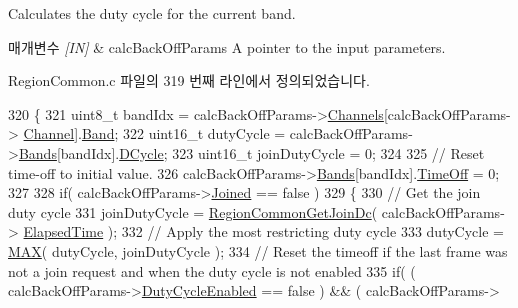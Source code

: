 Calculates the duty cycle for the current band. 


\begin{DoxyParams}{매개변수}
{\em \mbox{[}\+I\+N\mbox{]}} & calc\+Back\+Off\+Params A pointer to the input parameters. \\
\hline
\end{DoxyParams}


Region\+Common.\+c 파일의 319 번째 라인에서 정의되었습니다.


\begin{DoxyCode}
320 \{
321     uint8\_t bandIdx = calcBackOffParams->\mbox{\hyperlink{structs_region_common_calc_back_off_params_afecbd1e457cbd79eb7072bd140ff33d4}{Channels}}[calcBackOffParams->
      \mbox{\hyperlink{structs_region_common_calc_back_off_params_a1ca6f01ca18afe402de51babe8c95f5e}{Channel}}].\mbox{\hyperlink{structs_channel_params_a724c03aa06953111c3291243831f251b}{Band}};
322     uint16\_t dutyCycle = calcBackOffParams->\mbox{\hyperlink{structs_region_common_calc_back_off_params_a18afce97f43b46e9d294e5babbb15f15}{Bands}}[bandIdx].\mbox{\hyperlink{structs_band_a9ab2dfbcbe5e7e43c95ff6a436886139}{DCycle}};
323     uint16\_t joinDutyCycle = 0;
324 
325     \textcolor{comment}{// Reset time-off to initial value.}
326     calcBackOffParams->\mbox{\hyperlink{structs_region_common_calc_back_off_params_a18afce97f43b46e9d294e5babbb15f15}{Bands}}[bandIdx].\mbox{\hyperlink{structs_band_a4de67f0652eb4259907c41ea8056c318}{TimeOff}} = 0;
327 
328     \textcolor{keywordflow}{if}( calcBackOffParams->\mbox{\hyperlink{structs_region_common_calc_back_off_params_ac2f6caa0f3b02d2ac5056c3ee7c22652}{Joined}} == \textcolor{keyword}{false} )
329     \{
330         \textcolor{comment}{// Get the join duty cycle}
331         joinDutyCycle = \mbox{\hyperlink{group___r_e_g_i_o_n_c_o_m_m_o_n_ga672466fcf1aedaaf075cdabf49bc0c28}{RegionCommonGetJoinDc}}( calcBackOffParams->
      \mbox{\hyperlink{structs_region_common_calc_back_off_params_a2ece30988e7a5bac284623173173c71a}{ElapsedTime}} );
332         \textcolor{comment}{// Apply the most restricting duty cycle}
333         dutyCycle = \mbox{\hyperlink{utilities_8h_afa99ec4acc4ecb2dc3c2d05da15d0e3f}{MAX}}( dutyCycle, joinDutyCycle );
334         \textcolor{comment}{// Reset the timeoff if the last frame was not a join request and when the duty cycle is not
       enabled}
335         \textcolor{keywordflow}{if}( ( calcBackOffParams->\mbox{\hyperlink{structs_region_common_calc_back_off_params_a4d755868e0e80089462286c3ba6a6f18}{DutyCycleEnabled}} == \textcolor{keyword}{false} ) && ( calcBackOffParams->

\end{DoxyCode}
